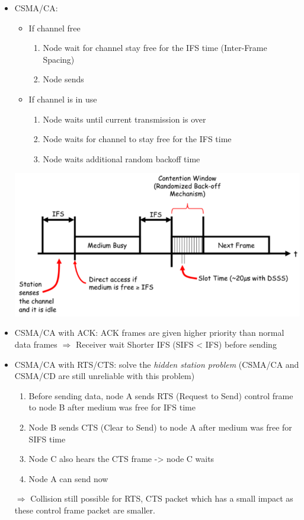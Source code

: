 \begin{itemize}
    \item CSMA/CA: 
        \begin{itemize}
            \item If channel free 
                \begin{enumerate}
                    \item Node wait for channel stay free for the IFS time
                        (Inter-Frame Spacing)
                    \item Node sends
                \end{enumerate}
            \item If channel is in use 
                \begin{enumerate} 
                    \item Node waits until current transmission is over
                    \item Node waits for channel to stay free for the IFS time
                    \item Node waits additional random backoff time
                \end{enumerate}
        \end{itemize}

        \begin{center}
            \includegraphics[width=0.7\linewidth]{img/CSMA.png}
        \end{center}

    \item CSMA/CA with ACK: ACK frames are given higher priority than
        normal data frames $\Rightarrow$ Receiver wait Shorter IFS
        (SIFS < IFS) before sending

    \item CSMA/CA with RTS/CTS: solve the \textit{hidden station
        problem} (CSMA/CA and CSMA/CD are still unreliable with this
        problem)
        \begin{enumerate}
            \item Before sending data, node A sends RTS (Request to
                Send) control frame to node B after medium was
                free for IFS time
            \item  Node B sends CTS (Clear to Send) to node A after
                medium was free for SIFS time
            \item Node C also hears the CTS frame -> node C waits
            \item Node A can send now
        \end{enumerate}

        $\Rightarrow$ Collision still possible for RTS, CTS packet which has
        a small impact as these control frame packet are smaller.
\end{itemize}


